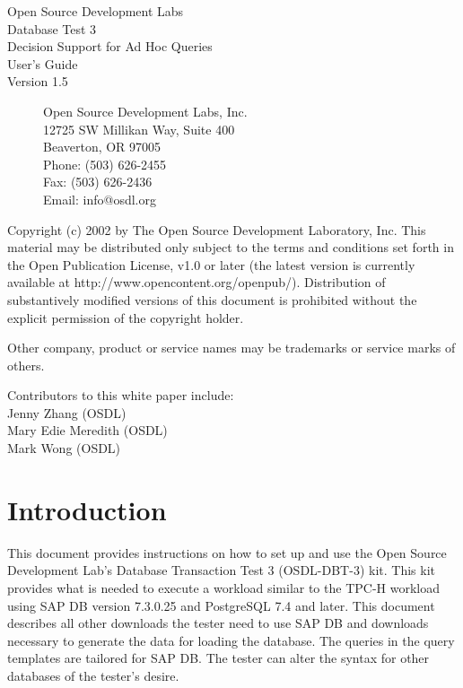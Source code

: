 \documentclass{article}
\begin{document}
\begin{titlepage}

\begin{figure}[t]
\centering
\end{figure}

\centering
\huge
Open Source Development Labs \\
Database Test 3 \\
Decision Support for Ad Hoc Queries \\
\huge
User's Guide \\
\large
Version 1.5

\begin{figure}[b]
\flushleft
\normalsize
Open Source Development Labs, Inc. \\
12725 SW Millikan Way, Suite 400 \\
Beaverton, OR 97005 \\
Phone: (503) 626-2455 \\
Fax: (503) 626-2436 \\
Email: info@osdl.org
\end{figure}

\end{titlepage}

\noindent
Copyright (c) 2002 by The Open Source Development Laboratory, Inc. This
material may be distributed only subject to the terms and conditions set forth
in the Open Publication License, v1.0 or later (the latest version is currently
available at http://www.opencontent.org/openpub/). Distribution of
substantively modified versions of this document is prohibited without the
explicit permission of the copyright holder.

\noindent
Other company, product or service names may be trademarks or service marks of
others.

\noindent
Contributors to this white paper include: \\
\indent Jenny Zhang (OSDL) \\
\indent Mary Edie Meredith (OSDL) \\
\indent Mark Wong (OSDL) \\

\pagebreak

\section{Introduction}

\noindent
This document provides instructions on how to set up and use the
Open Source Development Lab's Database Transaction Test 3
(OSDL-DBT-3) kit.  This kit provides what is needed to execute a
workload similar to the TPC-H workload using SAP DB version 7.3.0.25
and PostgreSQL 7.4 and later.  This document describes all other
downloads the tester need to use SAP DB and downloads necessary to
generate the data for loading the database.  The queries in the query
templates are tailored for SAP DB.  The tester can alter the syntax
for other databases of the tester's desire.
\end{document}
